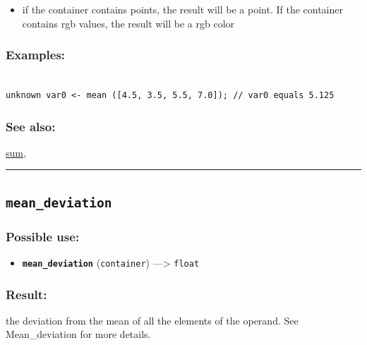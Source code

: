 \documentclass[]{book}
\providecommand{\tightlist}{%
  \setlength{\itemsep}{0pt}\setlength{\parskip}{0pt}}
\theoremstyle{definition}
\theoremstyle{definition}
\theoremstyle{definition}
\theoremstyle{remark}
\begin{document}
\begin{itemize}
\tightlist
\item
  if the container contains points, the result will be a point. If the
  container contains rgb values, the result will be a rgb color
\end{itemize}

\subsubsection{Examples:}\label{examples-236}

\begin{verbatim}
 
unknown var0 <- mean ([4.5, 3.5, 5.5, 7.0]); // var0 equals 5.125 
\end{verbatim}

\subsubsection{See also:}\label{see-also-137}

\href{operators-s-to-z.html\#sum}{sum},

\begin{center}\rule{0.5\linewidth}{\linethickness}\end{center}

\subsection{\texorpdfstring{\texttt{mean\_deviation}}{mean\_deviation}}\label{mean_deviation}

\subsubsection{Possible use:}\label{possible-use-344}

\begin{itemize}
\tightlist
\item
  \textbf{\texttt{mean\_deviation}} (\texttt{container})
  ---\textgreater{} \texttt{float}
\end{itemize}

\subsubsection{Result:}\label{result-333}

the deviation from the mean of all the elements of the operand. See
Mean\_deviation for more details.
\end{document}
